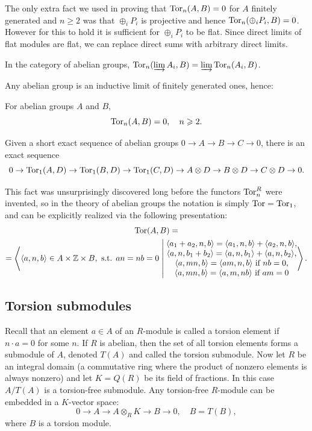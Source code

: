 The only extra fact we used in proving that $\operatorname{Tor}_n(A,B)=0$ for $A$ finitely generated and $n\geq 2$ was that $\oplus_i P_i$ is projective and hence $\operatorname{Tor}_n(\oplus_i P_i,B)=0$. However for this to hold it is sufficient for $\oplus_i P_i$ to be flat. Since direct limits of flat modules are flat, we can replace direct sums with arbitrary direct limits.

\begin{thm} In the category of abelian groups,
    $\operatorname{Tor}_n(\varinjlim A_i,B)=\varinjlim \operatorname{Tor}_n(A_i,B)$.
\end{thm}
Any abelian group is an inductive limit of finitely generated ones, hence:
\begin{cor}
    For abelian groups $A$ and $B$,
    \[\operatorname{Tor}_n(A,B)=0,\quad n\geqslant 2.\]
\end{cor}
\begin{cor}
    Given a short exact sequence of abelian groups $0\to A\to B\to C\to 0$, there is an exact sequence
    \[0\to\operatorname{Tor}_1(A,D)\to \operatorname{Tor}_1(B,D)\to \operatorname{Tor}_1(C,D)\to A\otimes D\to B\otimes D\to C\otimes D\to 0.\]
\end{cor}

This fact was unsurprisingly discovered long before the functors $\operatorname{Tor}_n^R$ were invented, so in the theory of abelian groups the notation is simply $\operatorname{Tor}=\operatorname{Tor}_1$, and can be explicitly realized via the following presentation:
\begin{multline}
    \Tor(A,B)=\\
    =\left\langle \langle a,n,b\rangle\in A\times \bbZ\times B,\text{ s.t. } an=nb=0 
    \middle|
    \begin{matrix}
    \langle a_1+a_2,n,b\rangle= \langle a_1,n,b\rangle+\langle a_2,n,b\rangle,\\
    \langle a,n,b_1+b_2\rangle=\langle a,n,b_1\rangle+\langle a,n,b_2\rangle,\\
    \langle a,mn,b\rangle=\langle am,n,b\rangle \text{ if }nb=0,\\
    \langle a,mn,b\rangle=\langle a,m,nb\rangle \text{ if }am=0
    \end{matrix}
    \right\rangle.
\end{multline}




\subsection{Torsion submodules}

Recall that an element $a\in A$ of an $R$-module is called a torsion element if $n\cdot a=0$ for some $n$. If $R$ is abelian, then the set of all torsion elements forms a submodule of $A$, denoted $T(A)$ and called the torsion submodule. Now let $R$ be an integral domain (a commutative ring where the product of nonzero elements is always nonzero) and let $K=Q(R)$ be its field of fractions. In this case $A\slash T(A)$ is a torsion-free submodule. Any torsion-free $R$-module can be embedded in a $K$-vector space:
\[0\to A\to A\otimes_R K\to B\to 0,\quad B=T(B),\]
where $B$ is a torsion module.

